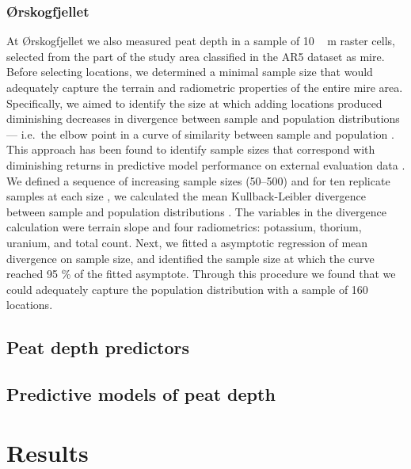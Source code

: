 \documentclass[soil, manuscript]{copernicus}
\begin{document}
\subsubsection{Ørskogfjellet}

At Ørskogfjellet we also measured peat depth in a sample of \unit{10\,m} raster cells, selected from the part of the study area classified in the AR5 dataset as mire.
Before selecting locations, we determined a minimal sample size that would adequately capture the terrain and radiometric properties of the entire mire area.
Specifically, we aimed to identify the size at which adding locations produced diminishing decreases in divergence between sample and population distributions --- i.e.~the elbow point in a curve of similarity between sample and population \citep{maloneMethodsImproveUtility2019}.
This approach has been found to identify sample sizes that correspond with diminishing returns in predictive model performance on external evaluation data \citep{sauretteDivergenceMetricsDetermining2023}.
We defined a sequence of increasing sample sizes (50--500) and for ten replicate samples at each size \citep[drawn by conditioned latin hypercube sampling,][]{minasnyConditionedLatinHypercube2006, roudierClhsPackageConditioned2011}, we calculated the mean Kullback-Leibler divergence between sample and population distributions \citep{maloneMethodsImproveUtility2019, sauretteDivergenceMetricsDetermining2023}.
The variables in the divergence calculation were terrain slope and four radiometrics: potassium, thorium, uranium, and total count.
Next, we fitted a asymptotic regression of mean divergence on sample size, and identified the sample size at which the curve reached 95 \% of the fitted asymptote.
Through this procedure we found that we could adequately capture the population distribution with a sample of 160 locations.

\subsection{Peat depth predictors}

\subsection{Predictive models of peat depth}

\section{Results}
\end{document}
